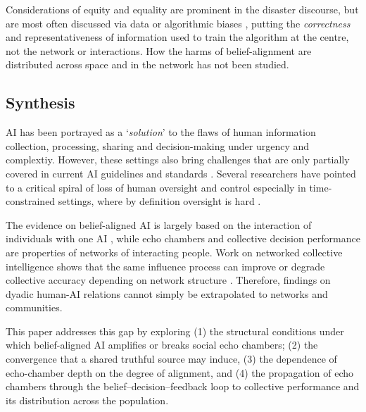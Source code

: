 \documentclass[pdflatex,sn-basic]{sn-jnl}
\begin{document}
Considerations of equity and equality are prominent in the disaster discourse, but are most often discussed via data or algorithmic biases \citep{coleman2024weaving, beduschi2022harnessing}, putting the \textit{correctness} and representativeness of information used to train the algorithm at the centre, not the network or interactions. 
How the harms of belief-alignment are distributed across space and in the network has not been studied.

\subsection{Synthesis}\label{sec:synthesis}

AI has been portrayed as a `\textit{solution}' to the flaws of human information collection, processing, sharing and decision-making under
urgency and complextiy. However, these settings also bring challenges that are only partially covered in current AI guidelines and standards \citep{ozmengaribay2023six, comes2026}. Several researchers have pointed to a critical spiral of loss of human oversight and control especially in time-constrained settings, where by definition oversight is hard \citep{comes2024ai}. 

The evidence on belief-aligned AI is largely based on the interaction of individuals with one AI \citep{glikson2020human, glickman2024human,sharma2024towards}, while
echo chambers and collective decision performance are properties of networks of interacting people. Work on networked
collective intelligence shows that the same influence process can improve or degrade collective accuracy depending on network structure \citep{lorenz2011social, becker2017network}. Therefore, findings on dyadic human-AI relations cannot
simply be extrapolated to networks and communities. 

This paper addresses this gap by exploring (1) the structural conditions under which belief-aligned AI amplifies or breaks social echo
chambers; (2) the convergence that a shared truthful source may induce, (3) the dependence of echo-chamber depth on the degree of alignment, and (4) the propagation of echo chambers through the belief--decision--feedback loop to collective performance and its distribution across the population. 
\end{document}
